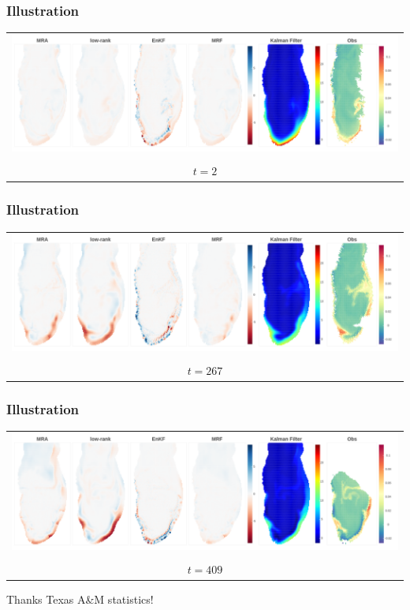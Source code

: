 \documentclass[usenames,dvipsnames,svgnames,table]{beamer}
\begin{document}
\begin{frame}
	\frametitle{Illustration}
	\begin{tabular}{c}
		\includegraphics[trim=200 0 0 0, clip, width=1.0\textwidth]{images/282.png}\\
		\\
		$t=2$
	\end{tabular}
\end{frame}
\begin{frame}
	\frametitle{Illustration}
	\begin{tabular}{c}
		\includegraphics[trim=200 0 0 0, clip, width=1.0\textwidth]{images/547.png}\\
		\\
		$t=267$
	\end{tabular}
\end{frame}
\begin{frame}
	\frametitle{Illustration}
	\begin{tabular}{c}
		\includegraphics[trim=200 0 0 0, clip, width=1.0\textwidth]{images/689.png}\\
		\\
		$t=409$
	\end{tabular}
\end{frame}


\begin{frame}
\centering
\huge{Thanks Texas A\&M statistics!}
\end{frame}
\end{document}
